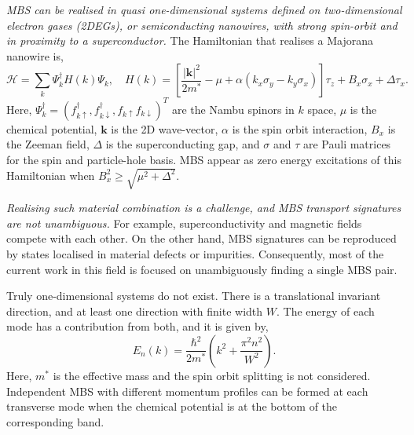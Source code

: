\textit{MBS can be realised in quasi one-dimensional systems defined on two-dimensional electron gases (2DEGs), or semiconducting nanowires, with strong spin-orbit and in proximity to a superconductor.}
The Hamiltonian that realises a Majorana nanowire is,
\begin{equation}\label{eq:ham_maj}
\mathcal{H} = \sum_k \Psi_k^\dagger H(k) \Psi_k  ,\quad H(k) =  \left[ \frac{|\mathbf{k}|^2}{2 m^*} - \mu + \alpha(k_x \sigma_y - k_y \sigma_x) \right] \tau_z + B_x \sigma_x  + \Delta \tau_x.
\end{equation}
Here, $\Psi_k^\dagger = (f_{k\uparrow}^\dagger, f_{k\downarrow}^\dagger, f_{k\uparrow} f_{k\downarrow})^T$ are the Nambu spinors in $k$ space, $\mu$ is the chemical potential, $\mathbf{k}$ is the 2D wave-vector, $\alpha$ is the spin orbit interaction, $B_x$ is the Zeeman field, $\Delta$ is the superconducting gap, and $\sigma$ and $\tau$ are Pauli matrices for the spin and particle-hole basis.
MBS appear as zero energy excitations of this Hamiltonian when $B_x^2 \geq \sqrt{\mu^2 + \Delta^2}$.

\textit{Realising such material combination is a challenge, and MBS transport signatures are not unambiguous.}
For example, superconductivity and magnetic fields compete with each other.
On the other hand, MBS signatures can be reproduced by states localised in material defects or impurities.
Consequently, most of the current work in this field is focused on unambiguously finding a single MBS pair.

Truly one-dimensional systems do not exist.
There is a translational invariant direction, and at least one direction with finite width $W$.
The energy of each mode has a contribution from both, and it is given by,
\begin{equation}
E_{n}(k) = \frac{\hbar^{2}}{2m^*} \left( k^{2} + \frac{\pi^{2} n^{2}}{W^{2}} \right).
\end{equation}
Here, $m^{*}$ is the effective mass and the spin orbit splitting is not considered.
Independent MBS with different momentum profiles can be formed at each transverse mode when the chemical potential is at the bottom of the corresponding band.

